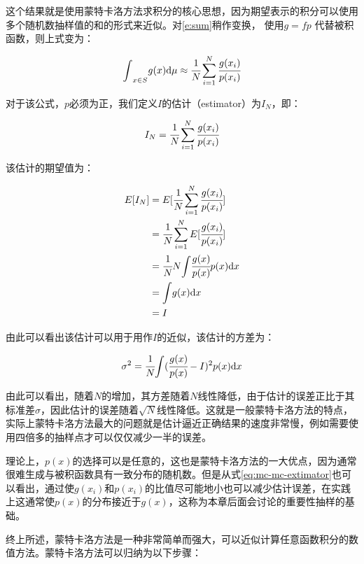 这个结果就是使用蒙特卡洛方法求积分的核心思想，因为期望表示的积分可以使用多个随机数抽样值的和的形式来近似。对\ref{e:sum}稍作变换， 使用$g=fp$ 代替被积函数，则上式变为：

\begin{equation}
	{\rm \int}_{x\in S}g(x){\rm d}\mu\approx \cfrac{1}{N}\sum_{i=1}^{N} \cfrac{g(x_i)}{p(x_i)}
\end{equation}

\noindent 对于该公式，$p$必须为正，我们定义$I$的估计（estimator）为$I_N$，即：

\begin{equation}\label{eq:mc-mc-extimator}
	I_N= \cfrac{1}{N}\sum_{i=1}^{N} \cfrac{g(x_i)}{p(x_i)}
\end{equation}

\noindent 该估计的期望值为：

\begin{equation}
	\begin{aligned}
		E[I_N]&=E[ \cfrac{1}{N}\sum_{i=1}^{N} \cfrac{g(x_i)}{p(x_i)}]\\
		&= \cfrac{1}{N}\sum_{i=1}^{N}E[ \cfrac{g(x_i)}{p(x_i)}]\\
		&= \cfrac{1}{N}N{\rm \int}  \cfrac{g(x)}{p(x)}p(x){\rm d}x\\
		&={\rm \int} g(x){\rm d}x\\
		&=I
	\end{aligned}
\end{equation}

\noindent 由此可以看出该估计可以用于用作$I$的近似，该估计的方差为：

\begin{equation}\label{e:variance}
	\sigma^2= \cfrac{1}{N}{\rm \int}( \cfrac{g(x)}{p(x)}-I)^2p(x){\rm d}x
\end{equation}

由此可以看出，随着$N$的增加，其方差随着$N$线性降低，由于估计的误差正比于其标准差$\sigma$，因此估计的误差随着$\sqrt{N}$线性降低。这就是一般蒙特卡洛方法的特点，实际上蒙特卡洛方法最大的问题就是估计逼近正确结果的速度非常慢，例如需要使用四倍多的抽样点才可以仅仅减少一半的误差。 

理论上，$p(x)$的选择可以是任意的，这也是蒙特卡洛方法的一大优点，因为通常很难生成与被积函数具有一致分布的随机数。但是从式\ref{eq:mc-mc-extimator}也可以看出，通过使$g(x_i)$和$p(x_i)$的比值尽可能地小也可以减少估计误差，在实践上这通常使$p(x)$的分布接近于$g(x)$，这称为本章后面会讨论的重要性抽样的基础。

终上所述，蒙特卡洛方法是一种非常简单而强大，可以近似计算任意函数积分的数值方法。蒙特卡洛方法可以归纳为以下步骤：

